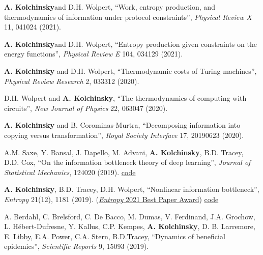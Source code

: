 \textbf{A. Kolchinsky}\CA and D.H. Wolpert, ``Work, entropy production, and thermodynamics of information under protocol constraints'', \emph{Physical Review X} 11, 041024 (2021).  

\textbf{A. Kolchinsky}\CA and D.H. Wolpert, ``Entropy production given constraints on the energy functions'', \emph{Physical Review E} 104, 034129 (2021).  

\textbf{A. Kolchinsky} and D.H. Wolpert, ``Thermodynamic costs of Turing machines'', \emph{Physical Review Research} 2, 033312 (2020).    %

D.H. Wolpert and \textbf{A. Kolchinsky}, ``The thermodynamics of computing with circuits'', \emph{New Journal of Physics} 22, 063047 (2020).   %

\textbf{A. Kolchinsky} and B. Corominas-Murtra, ``Decomposing information into copying versus transformation'', \emph{Royal Society Interface} 17, 20190623 (2020).   %

A.M. Saxe, Y. Bansal, J. Dapello, M. Advani, \textbf{A. Kolchinsky}, B.D. Tracey, D.D. Cox, ``On the information bottleneck theory of deep learning'',  \emph{Journal of Statistical Mechanics}, 124020 (2019).  \href{https://github.com/artemyk/ibsgd/tree/iclr2018}{code}  %

\textbf{A. Kolchinsky}\CA, B.D. Tracey, D.H. Wolpert, ``Nonlinear information bottleneck'', \emph{Entropy} 21(12), 1181 (2019). (\href{https://www.mdpi.com/journal/entropy/awards/1209}{{\emph{Entropy} 2021 Best Paper Award}})  \href{https://github.com/artemyk/nonlinearIB}{code} 

A. Berdahl, C. Brelsford, C. De Bacco, M. Dumas, V. Ferdinand, J.A. Grochow, L. Hébert-Dufresne, Y. Kallus, C.P. Kempes, \textbf{A. Kolchinsky}, D. B. Larremore, E. Libby, E.A. Power, C.A. Stern, B.D.Tracey, ``Dynamics of beneficial epidemics'', \emph{Scientific Reports} 9, 15093 (2019).  

